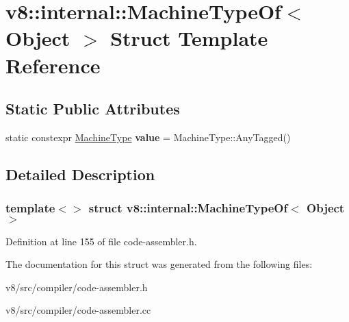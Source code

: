 \hypertarget{structv8_1_1internal_1_1MachineTypeOf_3_01Object_01_4}{}\section{v8\+:\+:internal\+:\+:Machine\+Type\+Of$<$ Object $>$ Struct Template Reference}
\label{structv8_1_1internal_1_1MachineTypeOf_3_01Object_01_4}
\subsection*{Static Public Attributes}
\begin{DoxyCompactItemize}
\item 
\mbox{\label{structv8_1_1internal_1_1MachineTypeOf_3_01Object_01_4_a88b5371804164cdeff89745df73770e6}} 
static constexpr \mbox{\hyperlink{classv8_1_1internal_1_1MachineType}{Machine\+Type}} {\bfseries value} = Machine\+Type\+::\+Any\+Tagged()
\end{DoxyCompactItemize}


\subsection{Detailed Description}
\subsubsection*{template$<$$>$\newline
struct v8\+::internal\+::\+Machine\+Type\+Of$<$ Object $>$}



Definition at line 155 of file code-\/assembler.\+h.



The documentation for this struct was generated from the following files\+:\begin{DoxyCompactItemize}
\item 
v8/src/compiler/code-\/assembler.\+h\item 
v8/src/compiler/code-\/assembler.\+cc\end{DoxyCompactItemize}
